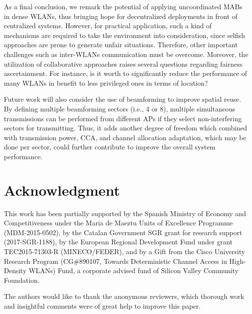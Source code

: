 \documentclass[preprint,12pt]{elsarticle}
\begin{document}
As a final conclusion, we remark the potential of applying uncoordinated MABs in dense WLANs, thus bringing hope for decentralized deployments in front of centralized systems. However, for practical application, such a kind of mechanisms are required to take the environment into consideration, since selfish approaches are prone to generate unfair situations. Therefore, other important challenges such as inter-WLANs communication must be overcome. Moreover, the utilization of collaborative approaches raises several questions regarding fairness ascertainment. For instance, is it worth to significantly reduce the performance of many WLANs in benefit to less privileged ones in terms of location?

Future work will also consider the use of beamforming to improve spatial reuse. By defining multiple beamforming sectors (i.e., 4 or 8), multiple simultaneous transmissions can be performed from different APs if they select non-interfering sectors for transmitting. Thus, it adds another degree of freedom which combined with transmission power, CCA, and channel allocation adaptation, which may be done per sector, could further contribute to improve the overall system performance.

\section*{Acknowledgment}
This work has been partially supported by the Spanish Ministry of Economy and Competitiveness under the Maria de Maeztu Units of Excellence Programme (MDM-2015-0502), by the Catalan Government SGR grant for research support (2017-SGR-1188), by the European Regional Development Fund under grant TEC2015-71303-R (MINECO/FEDER), and by a Gift from the Cisco University Research Program (CG\#890107, Towards Deterministic Channel Access in High-Density WLANs) Fund, a corporate advised fund of Silicon Valley Community Foundation.

The authors would like to thank the anonymous reviewers, which thorough work and insightful comments were of great help to improve this paper.
\end{document}
